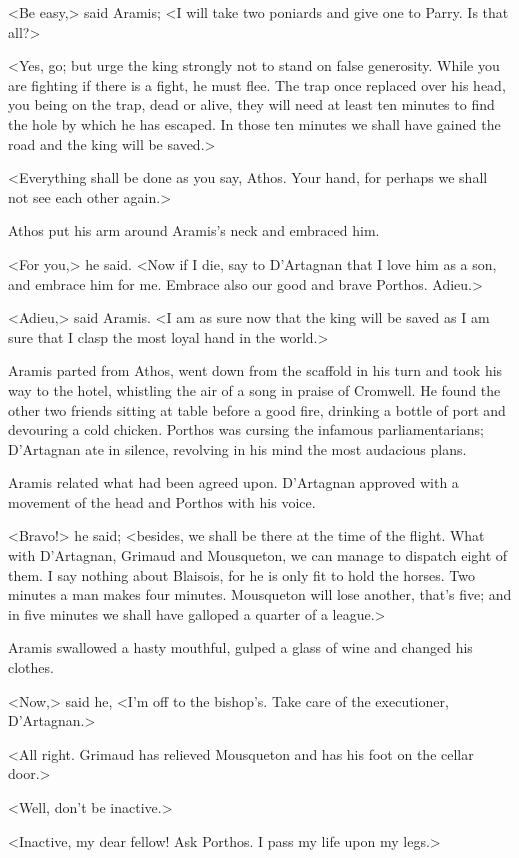 <Be easy,> said Aramis; <I will take two poniards and give one to Parry. Is that all?>

<Yes, go; but urge the king strongly not to stand on false generosity. While you are fighting if there is a fight, he must flee. The trap once replaced over his head, you being on the trap, dead or alive, they will need at least ten minutes to find the hole by which he has escaped. In those ten minutes we shall have gained the road and the king will be saved.>

<Everything shall be done as you say, Athos. Your hand, for perhaps we shall not see each other again.>

Athos put his arm around Aramis's neck and embraced him.

<For you,> he said. <Now if I die, say to D'Artagnan that I love him as a son, and embrace him for me. Embrace also our good and brave Porthos. Adieu.>

<Adieu,> said Aramis. <I am as sure now that the king will be saved as I am sure that I clasp the most loyal hand in the world.>

Aramis parted from Athos, went down from the scaffold in his turn and took his way to the hotel, whistling the air of a song in praise of Cromwell. He found the other two friends sitting at table before a good fire, drinking a bottle of port and devouring a cold chicken. Porthos was cursing the infamous parliamentarians; D'Artagnan ate in silence, revolving in his mind the most audacious plans.

Aramis related what had been agreed upon. D'Artagnan approved with a movement of the head and Porthos with his voice.

<Bravo!> he said; <besides, we shall be there at the time of the flight. What with D'Artagnan, Grimaud and Mousqueton, we can manage to dispatch eight of them. I say nothing about Blaisois, for he is only fit to hold the horses. Two minutes a man makes four minutes. Mousqueton will lose another, that's five; and in five minutes we shall have galloped a quarter of a league.>

Aramis swallowed a hasty mouthful, gulped a glass of wine and changed his clothes.

<Now,> said he, <I'm off to the bishop's. Take care of the executioner, D'Artagnan.>

<All right. Grimaud has relieved Mousqueton and has his foot on the cellar door.>

<Well, don't be inactive.>

<Inactive, my dear fellow! Ask Porthos. I pass my life upon my legs.>

